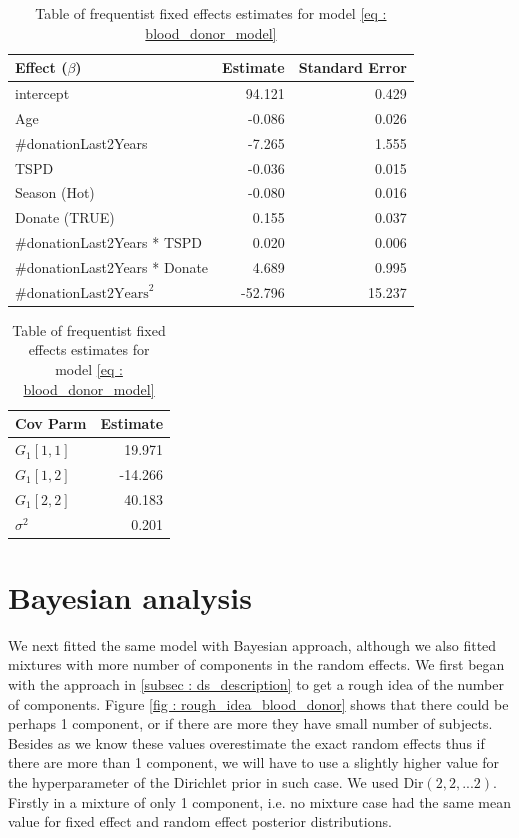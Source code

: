 \begin{table}[!htb]
\centering
\caption{Table of frequentist fixed effects estimates for model \ref{eq : blood_donor_model}}
\label{table : frequentist_fixed effects}
\begin{tabular}{@{}lrr@{}}
\toprule
Effect ($\beta$) & Estimate & Standard Error \\ \midrule
intercept & 94.121 & 0.429 \\
Age & -0.086 & 0.026 \\
\#donationLast2Years & -7.265 & 1.555 \\
TSPD & -0.036 & 0.015 \\
Season (Hot) & -0.080 & 0.016 \\
Donate (TRUE) & 0.155 & 0.037 \\
\#donationLast2Years * TSPD & 0.020 & 0.006 \\
\#donationLast2Years * Donate & 4.689 & 0.995 \\
$\text{\#donationLast2Years}^2$ & -52.796 & 15.237 \\ \bottomrule
\end{tabular}

\begin{tabular}{@{}lr@{}}
\toprule
Cov Parm & Estimate \\ \midrule
$G_1[1,1]$ & 19.971 \\
$G_1[1,2]$ & -14.266 \\
$G_1[2,2]$ & 40.183 \\
$\sigma^2$ & 0.201 \\ \bottomrule
\end{tabular}
\end{table}

\section{Bayesian analysis}
We next fitted the same model with Bayesian approach, although we also fitted mixtures with more number of components in the random effects. We first began with the approach in \ref{subsec : ds_description} to get a rough idea of the number of components. Figure \ref{fig : rough_idea_blood_donor} shows that there could be perhaps 1 component, or if there are more they have small number of subjects. Besides as we know these values overestimate the exact random effects thus if there are more than 1 component, we will have to use a slightly higher value for the hyperparameter of the Dirichlet prior in such case. We used $\text{Dir}(2, 2,...2)$. Firstly in a mixture of only 1 component, i.e. no mixture case had the same mean value for fixed effect and random effect posterior distributions.\\

